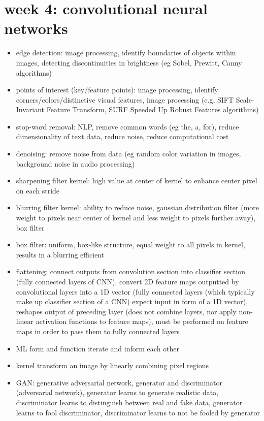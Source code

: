 \documentclass[10pt]{article}
\begin{document}
\section*{week 4: convolutional neural networks}

\begin{itemize}[label=\(\star\), leftmargin=1em, itemsep=-0.3em]
    \item edge detection: image processing, identify boundaries of objects within images, detecting discontinuities in brightness (eg Sobel, Prewitt, Canny algorithms)
    \item points of interest (key/feature points): image processing, identify corners/colors/distinctive visual features, image processing (e.g, SIFT Scale-Invariant Feature Transform, SURF Speeded Up Robust Features algorithms)
    \item stop-word removal: NLP, remove common words (eg the, a, for), reduce dimensionality of text data, reduce noise, reduce computational cost
    \item denoising: remove noise from data (eg random color variation in images, background noise in audio processing)
    \item sharpening filter kernel: high value at center of kernel to enhance center pixel on each stride
    \item blurring filter kernel: ability to reduce noise, gaussian distribution filter (more weight to pixels near center of kernel and less weight to pixels further away), box filter
    \item box filter: uniform, box-like structure, equal weight to all pixels in kernel, results in a blurring efficient
    \item flattening: connect outputs from convolution section into classifier section (fully connected layers of CNN), convert 2D feature maps outputted by convolutional layers into a 1D vector (fully connected layers (which typically make up classifier section of a CNN) expect input in form of a 1D vector), reshapes output of preceding layer (does not combine layers, nor apply non-linear activation functions to feature maps),  must be performed on feature maps in order to pass them to fully connected layers
    \item ML form and function iterate and inform each other
    \item kernel transform an image by linearly combining pixel regions
    \item GAN: generative adversarial network, generator and discriminator (adversarial network), generator learns to generate realistic data, discriminator learns to distinguish between real and fake data, generator learns to fool discriminator, discriminator learns to not be fooled by generator

\end{itemize}
\end{document}
